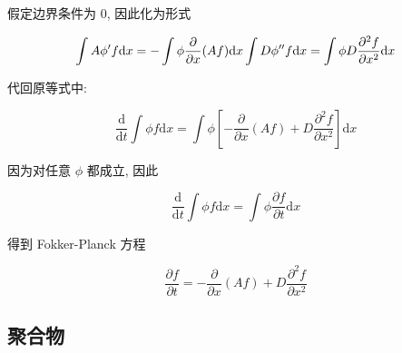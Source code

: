 \documentclass[../../main.tex]{subfiles}
\begin{document}
\begin{enumerate}
{{假定边界条件为 $0$, 因此化为形式

$$
\int A\phi^{\prime}f\mathrm{d}x = -\int \phi \frac{\partial }{\partial x}(Af)\mathrm{d}x\\
\int D\phi^{\prime\prime}f\mathrm{d}x = \int \phi D\frac{\partial^{2}f}{\partial x^{2}}\mathrm{d}x
$$

代回原等式中:

$$
\frac{\mathrm{d}}{\mathrm{d}t}\int\phi f\mathrm{d}x = \int \phi \left[
    -\frac{\partial }{\partial x}(Af) + D\frac{\partial^{2}f}{\partial x^{2}}
\right]\mathrm{d}x
$$

因为对任意 $\phi$ 都成立, 因此

$$
\frac{\mathrm{d}}{\mathrm{d}t}\int\phi f\mathrm{d}x = \int \phi \frac{\partial f}{\partial t}\mathrm{d}x
$$

得到 Fokker-Planck 方程

$$
\boxed{\frac{\partial f}{\partial t} = -\frac{\partial }{\partial x}(Af) + D\frac{\partial^{2}f}{\partial x^{2}}}
$$}}

\end{enumerate}

\subsection{聚合物}
\end{document}
